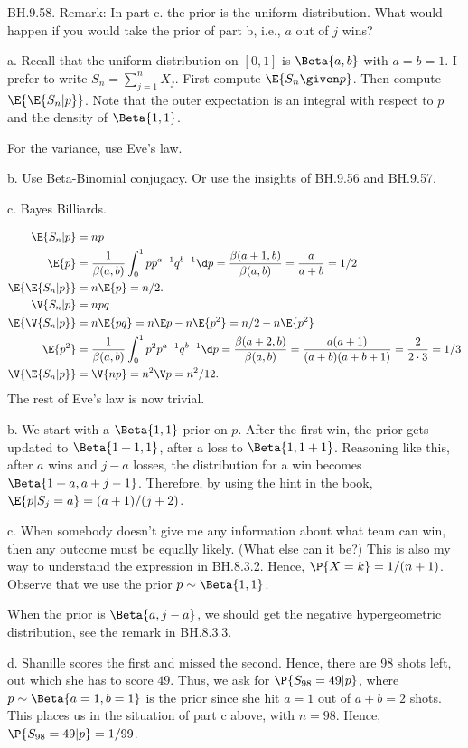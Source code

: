 
\setcounter{theorem}{57}
\begin{exercise} BH.9.58.
Remark: In part c.\/ the prior is the uniform distribution. What would happen if you would take the prior of part b, i.e., $a$ out of $j$ wins?
\begin{hint}
a. Recall that the uniform distribution on $[0,1]$ is $\Beta{a,b}$ with $a=b=1$. I prefer to write $S_n=\sum_{j=1}^n X_j$. First compute $\E{S_n\given p}$. Then compute $\E{\E{S_n| p}}$. Note that the outer expectation is an integral with respect to $p$ and the density of $\Beta{1,1}$.

For the variance, use Eve's law.

b. Use Beta-Binomial conjugacy. Or use the insights of BH.9.56 and BH.9.57.

c. Bayes Billiards.
\end{hint}

\begin{solution}
\begin{align*}
\E{S_n|p} &= np \\
\E{p} &= \frac 1{\beta(a,b)}\int_0^1pp^{a-1}q^{b-1}\d p = \frac{\beta(a+1,b)}{\beta(a,b)} = \frac a{a+b} = 1/2\\
\E{\E{S_n|p}} &= n\E{p} = n/2. \\
\V{S_n|p}  &= np q\\
\E{\V{S_n|p}}  &= n\E{p q} = n \E p - n \E{p^{2}} = n/2 - n\E{p^{2}}\\
\E{p^2} &=  \frac 1{\beta(a,b)}\int_0^1p^{2}p^{a-1}q^{b-1}\d p =
\frac{\beta(a+2,b)}{\beta(a,b)} = \frac{a(a+1)}{(a+b)(a+b+1)} = \frac 2{2\cdot 3} = 1/3\\
\V{\E{S_{n}|p}} &= \V{n p} = n^{2} \V p = n^{2}/12.
\end{align*}
The rest of Eve's law is now trivial.

b. We start with a $\Beta{1,1}$ prior on $p$. After the first win, the prior gets updated to $\Beta{1+1, 1}$, after a loss to $\Beta{1, 1+1}$. Reasoning like this, after $a$ wins and $j-a$ losses, the distribution for a win becomes $\Beta{1+a, a+ j-1}$. Therefore, by using the hint in the book,  $\E{p | S_j=a } = (a+1)/(j+2)$.

c. When somebody doesn't give me any information about what team can win, then any outcome must be equally likely. (What else can it be?)
This is also my way to understand the expression in BH.8.3.2. Hence, $\P{X=k} = 1/(n+1)$. Observe that we use the prior $p\sim\Beta{1,1}$.

When the prior is $\Beta{a, j-a}$, we should get the negative hypergeometric distribution, see the remark  in BH.8.3.3.

d. Shanille scores the first and missed the second. Hence, there are 98 shots left, out which she has to score $49$.  Thus, we ask for $\P{S_{98}=49|p}$, where $p\sim \Beta{a=1,b=1}$ is the prior since she hit $a=1$  out of $a+b=2$ shots. This places us in the situation of part c above, with $n=98$. Hence, $\P{S_{98}=49|p} = 1/99$.
\end{solution}
\end{exercise}

